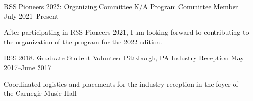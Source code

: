 
\begin{cventries}
  \cventry
  {RSS Pioneers 2022: Organizing Committee}
  {N/A}
  {Program Committee Member}
  {July 2021--Present}
  {
    \begin{cvitems}
    \item After participating in RSS Pioneers 2021, I am looking forward to
      contributing to the organization of the program for the 2022 edition.
    \end{cvitems}
  }
  \cventry
  {RSS 2018: Graduate Student Volunteer}
  {Pittsburgh, PA}
  {Industry Reception}
  {May 2017--June 2017}
  {
    \begin{cvitems}
    \item Coordinated logistics and placements for the industry reception
      in the foyer of the Carnegie Music Hall
    \end{cvitems}
  }
\end{cventries}
